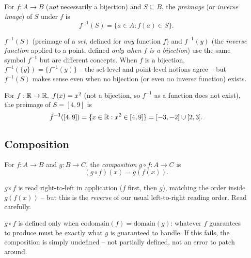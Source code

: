 \documentclass[11pt]{article}
\begin{document}
\begin{definition}
For $f: A \to B$ (\emph{not} necessarily a bijection) and $S \subseteq B$, the \emph{preimage} (or \emph{inverse image}) of $S$ under $f$ is
\[
f^{-1}(S) = \{a \in A : f(a) \in S\}.
\]
\end{definition}

\begin{note}
$f^{-1}(S)$ (preimage of a \emph{set}, defined for \emph{any} function $f$) and $f^{-1}(y)$ (the \emph{inverse function} applied to a point, defined \emph{only when $f$ is a bijection}) use the same symbol $f^{-1}$ but are different concepts. When $f$ is a bijection, $f^{-1}(\{y\}) = \{f^{-1}(y)\}$ -- the set-level and point-level notions agree -- but $f^{-1}(S)$ makes sense even when no bijection (or even no inverse function) exists.
\end{note}

\begin{example}
For $f: \mathbb{R} \to \mathbb{R},\ f(x) = x^2$ (not a bijection, so $f^{-1}$ as a function does not exist), the preimage of $S = [4,9]$ is
\[
f^{-1}([4,9]) = \{x \in \mathbb{R} : x^2 \in [4,9]\} = [-3,-2] \cup [2,3].
\]
\end{example}

\subsection{Composition}
\label{sec:2-9}

\begin{definition}[Composition]
For $f: A \to B$ and $g: B \to C$, the \emph{composition} $g \circ f : A \to C$ is
\[
(g \circ f)(x) = g(f(x)).
\]
\end{definition}

\begin{note}
$g \circ f$ is read right-to-left in application ($f$ first, then $g$), matching the order inside $g(f(x))$ -- but this is the \emph{reverse} of our usual left-to-right reading order. Read carefully.
\end{note}

\begin{note}
$g \circ f$ is defined only when $\mathrm{codomain}(f) = \mathrm{domain}(g)$: whatever $f$ guarantees to produce must be exactly what $g$ is guaranteed to handle. If this fails, the composition is simply undefined -- not partially defined, not an error to patch around.
\end{note}
\end{document}

